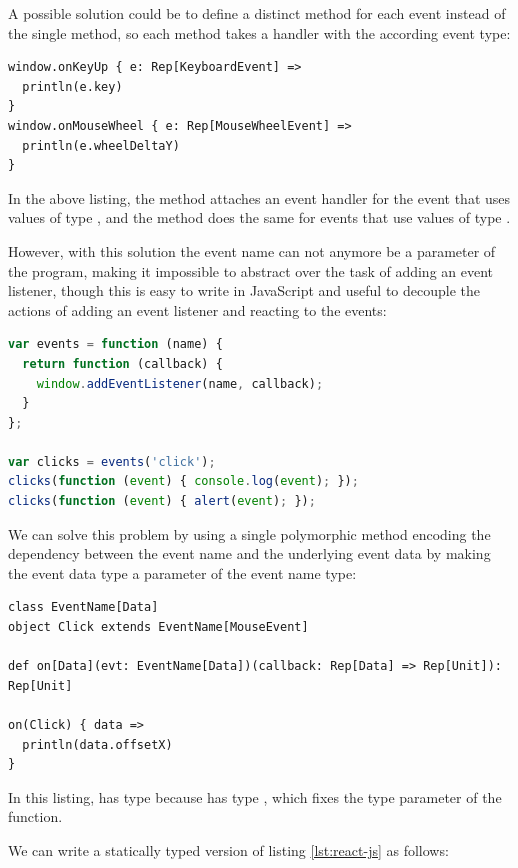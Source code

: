 \documentclass[runningheads,a4paper]{llncs}
\begin{document}
A possible solution could be to define a distinct method for each event instead of the single
 method, so each method takes a handler with the according event type:

\begin{lstlisting}
window.onKeyUp { e: Rep[KeyboardEvent] =>
  println(e.key)
}
window.onMouseWheel { e: Rep[MouseWheelEvent] =>
  println(e.wheelDeltaY)
}
\end{lstlisting}

In the above listing, the  method attaches an event handler for the  event
that uses values of type , and the  method does the same for
 events that use values of type .

However, with this solution the event name can not anymore be a parameter of the program, making it
impossible to abstract over the task of adding an event listener, though this is easy to write in
JavaScript and useful to decouple the actions of adding an event listener and reacting to the
events:

\begin{lstlisting}[language=JavaScript,label=react-js]
var events = function (name) {
  return function (callback) {
    window.addEventListener(name, callback);
  }
};

var clicks = events('click');
clicks(function (event) { console.log(event); });
clicks(function (event) { alert(event); });
\end{lstlisting}

We can solve this problem by using a single polymorphic method encoding the dependency between the
event name and the underlying event data by making the event data type a parameter of the event name
type:

\begin{lstlisting}
class EventName[Data]
object Click extends EventName[MouseEvent]

def on[Data](evt: EventName[Data])(callback: Rep[Data] => Rep[Unit]): Rep[Unit]

on(Click) { data =>
  println(data.offsetX)
}
\end{lstlisting}

In this listing,  has type  because  has type
, which fixes the  type parameter of the  function.

We can write a statically typed version of listing \ref{lst:react-js} as follows:
\end{document}
